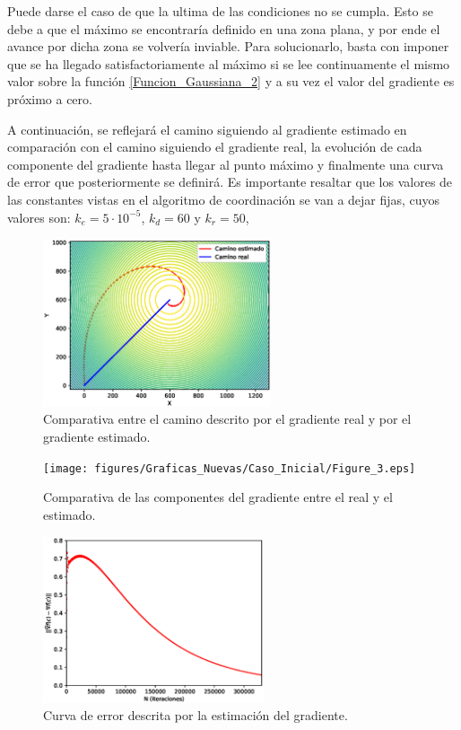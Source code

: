 Puede darse el caso de que la ultima de las condiciones no se cumpla. Esto se debe a que el máximo se encontraría definido en una zona plana, y por ende el avance por dicha zona se volvería inviable. Para solucionarlo, basta con imponer que se ha llegado satisfactoriamente al máximo si se lee continuamente el mismo valor sobre la función \ref{Funcion_Gaussiana_2} y a su vez el valor del gradiente es próximo a cero. 

A continuación, se reflejará el camino siguiendo al gradiente estimado en comparación con el camino siguiendo el gradiente real, la evolución de cada componente del gradiente hasta llegar al punto máximo y finalmente una curva de error que posteriormente se definirá. Es importante resaltar que los valores de las constantes vistas en el algoritmo de coordinación se van a dejar fijas, cuyos valores son: $k_{e}=5\cdot{10^{-5}}$, $k_{d}=60$ y $k_{r}=50$,

\begin{figure}[H]
\centering
\includegraphics[width=0.60\textwidth]{figures/Caso_Inicial/Caminos.eps}
\caption{Comparativa entre el camino descrito por el gradiente real y por el gradiente estimado.} \label{Dif_Caminos}
\end{figure}

\begin{figure}[H]
\centering
\texttt{[image: figures/Graficas\_Nuevas/Caso\_Inicial/Figure\_3.eps]}
\caption{Comparativa de las componentes del gradiente entre el real y el estimado.} \label{grad}
\end{figure}

\begin{figure}[H]
\centering
\includegraphics[width=0.58\textwidth]{figures/Graficas_Nuevas/Caso_Inicial/Figure_5.eps}
\caption{Curva de error descrita por la estimación del gradiente.} \label{Curva_error}
\end{figure}

